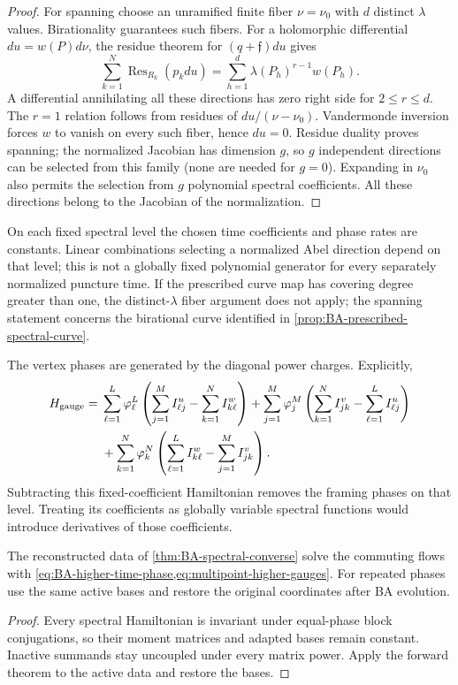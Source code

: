 \begin{proof}
For spanning choose an unramified finite fiber $\nu=\nu_0$
with $d$ distinct $\lambda$ values. Birationality guarantees such
fibers. For a holomorphic differential $du=w(P)d\nu$, the residue
theorem for $(q+\mathfrak f)du$ gives
\[
 \sum_{k=1}^{N}\operatorname{Res}_{R_k}(p_kdu)
 =\sum_{h=1}^{d}\lambda(P_h)^{r-1}w(P_h).
\]
A differential annihilating all these directions has zero right side
for $2\leq r\leq d$. The $r=1$ relation follows from residues of
$du/(\nu-\nu_0)$. Vandermonde inversion forces $w$ to vanish on
every such fiber, hence $du=0$. Residue duality proves spanning;
the normalized Jacobian has dimension $g$, so $g$ independent
directions can be selected from this family (none are needed for
$g=0$). Expanding in $\nu_0$ also permits the selection from $g$
polynomial spectral coefficients. All these directions belong to
the Jacobian of the normalization.
\end{proof}

On each fixed spectral level the chosen time coefficients and phase
rates are constants. Linear combinations selecting a normalized Abel
direction depend on that level; this is not a globally fixed
polynomial generator for every separately normalized puncture time.
If the prescribed curve map has covering degree greater than one,
the distinct-$\lambda$ fiber argument does not apply; the spanning
statement concerns the birational curve identified in
\cref{prop:BA-prescribed-spectral-curve}.

The vertex phases are generated by the diagonal power charges.
Explicitly,
\[
\begin{aligned}
 H_{\rm gauge}={}&
 \sum_{\ell=1}^{L}\varphi_{\ell}^L
 \left(\sum_{j=1}^{M}I^u_{\ell j}-\sum_{k=1}^{N}I^w_{k\ell}\right)
 +\sum_{j=1}^{M}\varphi_j^M
 \left(\sum_{k=1}^{N}I^v_{jk}-\sum_{\ell=1}^{L}I^u_{\ell j}\right)\\
 &+\sum_{k=1}^{N}\varphi_k^N
 \left(\sum_{\ell=1}^{L}I^w_{k\ell}-\sum_{j=1}^{M}I^v_{jk}\right).
\end{aligned}
\]
Subtracting this fixed-coefficient Hamiltonian removes the framing
phases on that level. Treating its coefficients as globally variable
spectral functions would introduce derivatives of those coefficients.

\begin{corollary}
\label{cor:BA-higher-reconstruction}
The reconstructed data of \cref{thm:BA-spectral-converse} solve the
commuting flows with \cref{eq:BA-higher-time-phase,eq:multipoint-higher-gauges}.
For repeated phases use the same active bases and restore the original
coordinates after BA evolution.
\end{corollary}
\begin{proof}
Every spectral Hamiltonian is invariant under equal-phase block
conjugations, so their moment matrices and adapted bases remain
constant. Inactive summands stay uncoupled under every matrix power.
Apply the forward theorem to the active data and restore the bases.
\end{proof}
